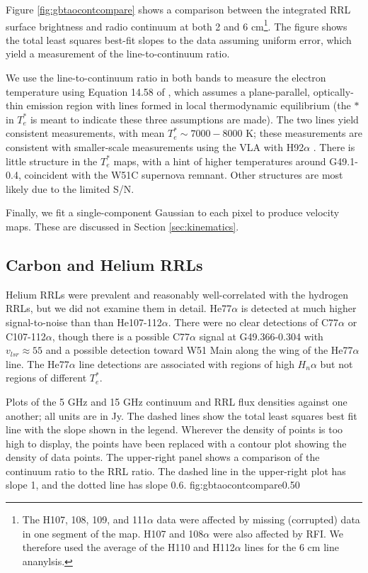 Figure \ref{fig:gbtaocontcompare} shows a comparison between the integrated RRL
surface brightness and radio continuum at both 2 and 6 cm\footnote{The H107,
108, 109, and 111$\alpha$ data were affected by missing (corrupted) data in one
segment of the map.  H107 and 108$\alpha$ were also affected by RFI.  We
therefore used the average of the H110 and H112$\alpha$ lines for the 6 cm line
ananylsis.}.  The figure shows
the total least squares best-fit slopes to the data assuming uniform error,
which yield a measurement of the line-to-continuum ratio.

We use the line-to-continuum ratio in both bands to measure the electron
temperature using Equation 14.58 of \citet{Wilson2009a}, which assumes a
plane-parallel, optically-thin emission region with lines formed in local
thermodynamic equilibrium (the $*$ in $T_e^*$ is meant to indicate these three
assumptions are made).  The two lines yield consistent measurements, with mean
$T_e^*\sim7000-8000$ K; these measurements are consistent with smaller-scale
measurements using the VLA with H92$\alpha$ \citep{Mehringer1994a}.  There is
little structure in the $T_e^*$ maps, with a hint of higher temperatures
around G49.1-0.4, coincident with the W51C supernova remnant.  Other structures
are most likely due to the limited S/N.

Finally, we fit a single-component Gaussian to each pixel to produce velocity
maps.  These are discussed in Section \ref{sec:kinematics}.

\subsection{Carbon and Helium RRLs}
Helium RRLs were prevalent and reasonably well-correlated with the hydrogen
RRLs, but we did not examine them in detail.  He77$\alpha$ is detected at much
higher signal-to-noise than than He107-112$\alpha$.  There were no clear
detections of C77$\alpha$ or C107-112$\alpha$, though there is a possible
C77$\alpha$ signal at G49.366-0.304 with $v_{lsr} \approx 55$ \kms and a
possible detection toward W51 Main along the wing of the He77$\alpha$ line.
The He77$\alpha$ line detections are associated with regions of high $H_n\alpha$
but not regions of different $T_e^*$.


{Plots of the 5 GHz and 15 GHz continuum and RRL flux densities against one
another; all units are in Jy.  The dashed lines show the total least squares
best fit line with the slope shown in the legend.  Wherever the density of
points is too high to display, the points have been replaced with a contour
plot showing the density of data points.  The upper-right panel shows a
comparison of the continuum ratio to the RRL ratio.  The dashed line in the
upper-right plot has slope 1, and the dotted line has slope 0.6.}
{fig:gbtaocontcompare}{0.5}{0}


